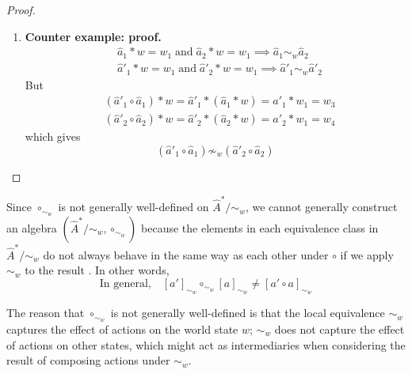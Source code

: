 \begin{proof}
\begin{enumerate}[(1)]
    \item \textbf{Counter example: proof.}
    \begin{align}
        & \hat{a}_{1} \ast w = w_{1} \; \text{and} \; \hat{a}_{2} \ast w = w_{1} \implies \hat{a}_{1} \sim_{w} \hat{a}_{2} \\
        & \hat{a}'_{1} \ast w = w_{1} \; \text{and} \; \hat{a}'_{2} \ast w = w_{1} \implies \hat{a}'_{1} \sim_{w} \hat{a}'_{2}
    \end{align}
    But
    \begin{align}
        & (\hat{a}'_{1} \circ \hat{a}_{1}) \ast w = \hat{a}'_{1} \ast (\hat{a}_{1} \ast w) = \hat{a}'_{1} \ast w_{1} = w_{3} \\
        & (\hat{a}'_{2} \circ \hat{a}_{2}) \ast w = \hat{a}'_{2} \ast (\hat{a}_{2} \ast w) = \hat{a}'_{2} \ast w_{1} = w_{4}
    \end{align}
    which gives
    \begin{equation}
        (\hat{a}'_{1} \circ \hat{a}_{1}) \not\sim_{w} (\hat{a}'_{2} \circ \hat{a}_{2})
    \end{equation}
\end{enumerate}
\end{proof}

Since $\circ_{\sim_{w}}$ is not generally well-defined on $\hat{A}^{*}/\sim_{w}$, we cannot generally construct an algebra $(\hat{A}^{*}/\sim_{w}, \circ_{\sim_{w}})$ because the elements in each equivalence class in $\hat{A}^{*}/\sim_{w}$ do not always behave in the same way as each other under $\circ$ if we apply $\sim_{w}$ to the result .
In other words,
\begin{equation}
    \text{In general,} \quad [a']_{\sim_{w}} \circ_{\sim_{w}} [a]_{\sim_{w}} \neq [a' \circ a]_{\sim_{w}}
\end{equation}

The reason that $\circ_{\sim_{w}}$ is not generally well-defined is that the local equivalence $\sim_{w}$ captures the effect of actions on the world state $w$; $\sim_{w}$ does not capture the effect of actions on other states, which might act as intermediaries when considering the result of composing actions under $\sim_{w}$.





